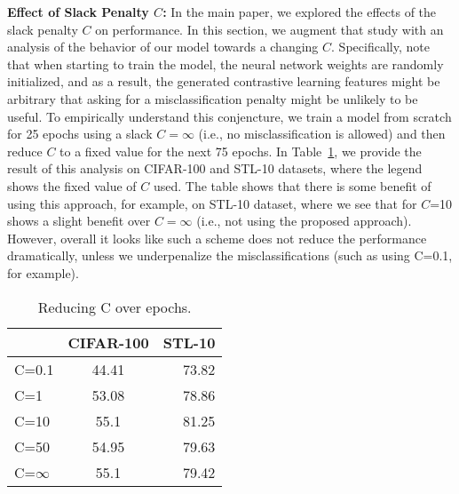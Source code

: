\documentclass[letterpaper]{article} \usepackage{aaai22}  \usepackage{times}  \usepackage{helvet}  \usepackage{courier}  \usepackage[hyphens]{url}  \usepackage{graphicx} \urlstyle{rm} \def\UrlFont{\rm}  \usepackage{natbib}  \usepackage{caption} \DeclareCaptionStyle{ruled}{labelfont=normalfont,labelsep=colon,strut=off} \frenchspacing  \setlength{\pdfpagewidth}{8.5in}  \setlength{\pdfpageheight}{11in}
\begin{document}
\noindent\textbf{Effect of Slack Penalty $C$:} In the main paper, we explored the effects of the slack penalty $C$ on performance. In this section, we augment that study with an analysis of the behavior of our model towards a changing $C$. Specifically, note that when starting to train the model, the neural network weights are randomly initialized, and as a result, the generated contrastive learning features might be arbitrary that asking for a misclassification penalty might be unlikely to be useful. To empirically understand this conjencture, we train a model from scratch for 25 epochs using a slack $C=\infty$ (i.e., no misclassification is allowed) and then reduce $C$ to a fixed value for the next 75 epochs. In Table~\ref{tab: reducing_C}, we provide the result of this analysis on CIFAR-100 and STL-10 datasets, where the legend shows the fixed value of $C$ used. The table shows that there is some benefit of using this approach, for example, on STL-10 dataset, where we see that for $C$=10 shows a slight benefit over $C=\infty$ (i.e., not using the proposed approach). However, overall it looks like such a scheme does not  reduce the performance dramatically, unless we underpenalize the misclassifications (such as using C=0.1, for example).

\begin{table}[]
    \centering
    \begin{tabular}{lcr}
    \toprule
      & CIFAR-100 & STL-10 \\
    \midrule
    C=0.1  & 44.41 & 73.82  \\
    C=1  & 53.08 &  78.86  \\
    C=10  & 55.1 &   81.25  \\
    C=50  & 54.95 & 79.63   \\
    C=$\infty$  & 55.1  & 79.42  \\
    \bottomrule
    \end{tabular}
     \caption{Reducing C over epochs.}
    \label{tab: reducing_C}
\end{table}
\end{document}
